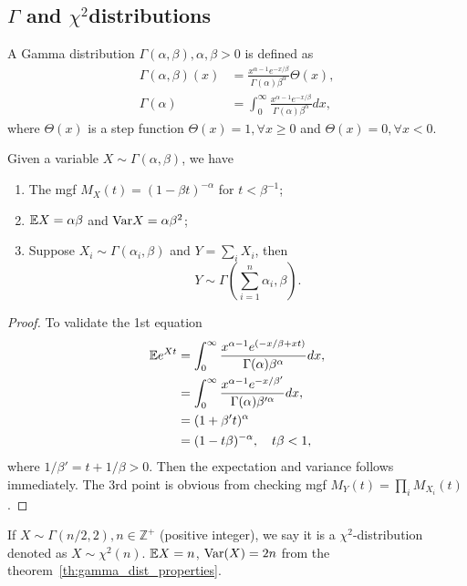 \subsection{\texorpdfstring{$\Gamma$}- and \texorpdfstring{$\chi^2$}-distributions}

\begin{definition}
A Gamma distribution $\Gamma(\alpha,\beta), \alpha,\beta>0$ is defined as
\begin{equation}
\begin{aligned}
\Gamma(\alpha,\beta)(x)&=\frac{x^{\alpha-1}e^{-x/\beta}}{\Gamma(\alpha)\beta^\alpha}\Theta(x),\\
\Gamma(\alpha)&=\int_0^\infty\frac{x^{\alpha-1}e^{-x/\beta}}{\Gamma(\alpha)\beta^\alpha}dx,
\end{aligned}
\end{equation}
where $\Theta(x)$ is a step function $\Theta(x)=1,\forall x\ge0$ and $\Theta(x)=0,\forall x<0$.
\end{definition}

\begin{theorem}
Given a variable $X\sim\Gamma(\alpha,\beta)$, we have 
\begin{enumerate}
\item The mgf $M_X(t)=(1-\beta t)^{-\alpha}$ for $t<\beta^{-1}$;
\item $\mathbb{E} X=\alpha\beta$ and $\text{Var} X =\alpha\beta^2$;
\item Suppose $X_i\sim\Gamma(\alpha_i,\beta)$ and $Y=\sum_iX_i$, then
\begin{equation}
Y\sim\Gamma\left(\sum_{i=1}^n\alpha_i,\beta\right).
\end{equation}
\end{enumerate}
\label{th:gamma_dist_properties}
\end{theorem}

\begin{proof}
To validate the 1st equation
\begin{equation}
\begin{aligned}
\mathbb{E} e^{Xt}&=\int_0^\infty \frac{x^{\alpha-1}e^{(-x/\beta+xt)}}{\Gamma(\alpha)\beta^\alpha}dx,\\
&=\int_0^\infty\frac{x^{\alpha-1}e^{-x/\beta'}}{\Gamma(\alpha)\beta'^\alpha}dx,\\
&=(1+\beta't)^\alpha\\
&=(1-t\beta)^{-\alpha},\quad t\beta<1,
\end{aligned}
\end{equation}
where $1/\beta'=t+1/\beta>0$. Then the expectation and variance follows immediately. The 3rd point is obvious from checking mgf $M_Y(t)=\prod_iM_{X_i}(t)$.
\end{proof}

\begin{definition}
If $X\sim\Gamma(n/2,2),n \in \mathbb{Z}^+$ (positive integer), we say it is a $\chi^2$-distribution denoted as $X\sim\chi^2(n)$. $\mathbb{E} X=n$, $\text{Var}(X)=2n$ from the theorem~\ref{th:gamma_dist_properties}.
\end{definition}
